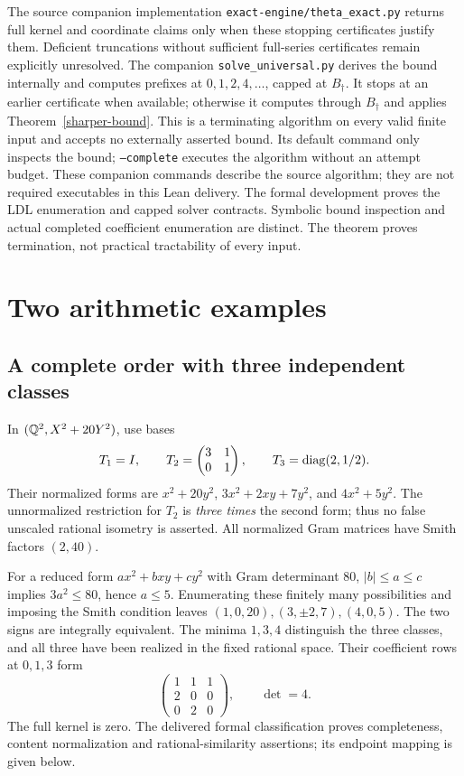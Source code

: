 \documentclass[11pt]{article}
\theoremstyle{remark}\newtheorem{remark}[theorem]{Remark}
\begin{document}
The source companion implementation \texttt{exact-engine/theta\_exact.py} returns
full kernel and coordinate claims only when these stopping certificates
justify them. Deficient truncations without sufficient full-series
certificates remain explicitly unresolved. The companion \texttt{solve\_universal.py} derives the bound internally
and computes prefixes at $0,1,2,4,\ldots$, capped at $B_\dagger$. It stops at
an earlier certificate when available; otherwise it computes through
$B_\dagger$ and applies Theorem~\ref{sharper-bound}. This is a terminating algorithm
on every valid finite input and accepts no externally asserted bound.
Its default command only inspects the bound; \texttt{--complete} executes
the algorithm without an attempt budget. These companion commands describe the source algorithm; they are not required
executables in this Lean delivery. The formal development proves the LDL
enumeration and capped solver contracts. Symbolic bound inspection and actual
completed coefficient enumeration are distinct. The theorem
proves termination, not practical tractability of every input.

\section{Two arithmetic examples}
\subsection{A complete order with three independent classes}
In $(\mathbb Q^2,X^2+20Y^2)$, use bases
\[
 T_1=I,\qquad T_2=\begin{pmatrix}3&1\\0&1\end{pmatrix},\qquad
 T_3=\operatorname{diag}(2,1/2).
\]
Their normalized forms are
$x^2+20y^2$, $3x^2+2xy+7y^2$, and $4x^2+5y^2$.
The unnormalized restriction for $T_2$ is \emph{three times} the second
form; thus no false unscaled rational isometry is asserted.
All normalized Gram matrices have Smith factors $(2,40)$.

For a reduced form $ax^2+bxy+cy^2$ with Gram determinant $80$,
$|b|\leq a\leq c$ implies $3a^2\leq80$, hence $a\leq5$.
Enumerating these finitely many possibilities and imposing the Smith
condition leaves $(1,0,20),(3,\pm2,7),(4,0,5)$. The two signs are
integrally equivalent. The minima $1,3,4$ distinguish the three classes,
and all three have been realized in the fixed rational space. Their
coefficient rows at $0,1,3$ form
\[
 \begin{pmatrix}1&1&1\\2&0&0\\0&2&0\end{pmatrix},
 \qquad\det=4.
\]
The full kernel is zero. The delivered formal classification proves completeness, content normalization
and rational-similarity assertions; its endpoint mapping is given below.
\end{document}
